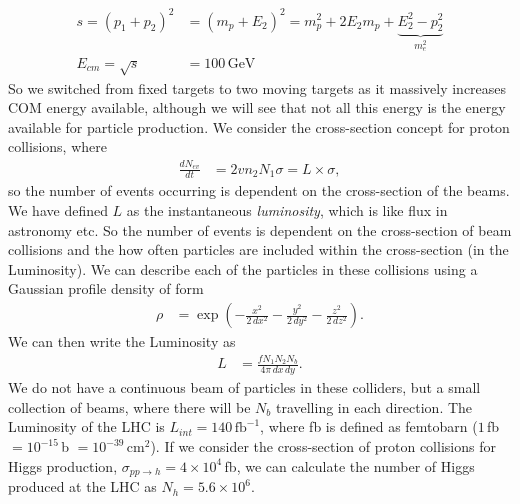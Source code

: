 \documentclass[a4paper, 11pt, normalem]{report}
\begin{document}
\begin{align}
    s = (p_1+p_2)^2 &= (m_p+E_2)^2 = m_p^2 + 2E_2m_p + \underbrace{E_2^2-p_2^2}_{m_e^2} \\
    E_{cm} = \sqrt{s} &= 100\,\text{GeV}
\end{align}
So we switched from fixed targets to two moving targets as it massively increases COM energy available, although we will see that not all this energy is the energy available for particle production.
We consider the cross-section concept for proton collisions, where
\begin{align}
    \frac{dN_{ev}}{dt} &= 2vn_2N_1\sigma = L\times\sigma,
\end{align}
so the number of events occurring is dependent on the cross-section of the beams.
We have defined $L$ as the instantaneous \emph{luminosity}, which is like flux in astronomy etc.
So the number of events is dependent on the cross-section of beam collisions and the how often particles are included within the cross-section (in the Luminosity).
We can describe each of the particles in these collisions using a Gaussian profile density of form
\begin{align}
    \rho &= \exp\left(-\frac{x^2}{2\,dx^2}-\frac{y^2}{2\,dy^2}-\frac{z^2}{2\,dz^2}\right).
\end{align}
We can then write the Luminosity as
\begin{align}
    L &= \frac{fN_1N_2N_b}{4\pi\,dx\,dy}.
\end{align}
We do not have a continuous beam of particles in these colliders, but a small collection of beams, where there will be $N_b$ travelling in each direction.
The Luminosity of the LHC is $L_{int}=140\,\text{fb}^{-1}$, where fb is defined as femtobarn ($1\,$fb $=10^{-15}\,$b $=10^{-39}\,$cm$^2$).
If we consider the cross-section of proton collisions for Higgs production, $\sigma_{pp\to h}=4\times10^4\,$fb, we can calculate the number of Higgs produced at the LHC as $N_{h}=5.6\times10^6$.
\end{document}
